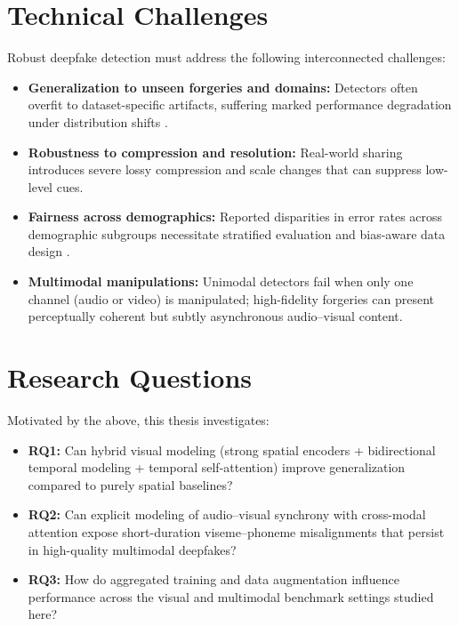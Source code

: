 \section{Technical Challenges}
Robust deepfake detection must address the following interconnected challenges:
\begin{itemize}
    \item \textbf{Generalization to unseen forgeries and domains:} Detectors often overfit to dataset-specific artifacts, suffering marked performance degradation under distribution shifts \cite{mubarak2023survey,rossler2019faceforensics}.
    \item \textbf{Robustness to compression and resolution:} Real-world sharing introduces severe lossy compression and scale changes that can suppress low-level cues.
    \item \textbf{Fairness across demographics:} Reported disparities in error rates across demographic subgroups necessitate stratified evaluation and bias-aware data design \cite{mubarak2023survey}.
    \item \textbf{Multimodal manipulations:} Unimodal detectors fail when only one channel (audio or video) is manipulated; high-fidelity forgeries can present perceptually coherent but subtly asynchronous audio–visual content.
\end{itemize}

\section{Research Questions}
Motivated by the above, this thesis investigates:
\begin{itemize}
    \item \textbf{RQ1:} Can hybrid visual modeling (strong spatial encoders + bidirectional temporal modeling + temporal self-attention) improve generalization compared to purely spatial baselines?
    \item \textbf{RQ2:} Can explicit modeling of audio–visual synchrony with cross-modal attention expose short-duration viseme–phoneme misalignments that persist in high-quality multimodal deepfakes?
    \item \textbf{RQ3:} How do aggregated training and data augmentation influence performance across the visual and multimodal benchmark settings studied here?
\end{itemize}

